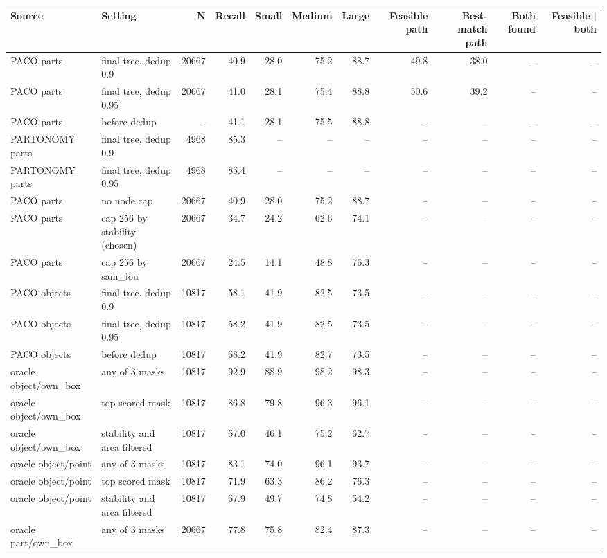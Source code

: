 \begin{tabular}{llrrrrrrrrr}
\toprule
Source & Setting & N & Recall & Small & Medium & Large & Feasible path & Best-match path & Both found & Feasible $\mid$ both \\
\midrule
PACO parts & final tree, dedup 0.9 & 20667 & 40.9 & 28.0 & 75.2 & 88.7 & 49.8 & 38.0 & -- & -- \\
PACO parts & final tree, dedup 0.95 & 20667 & 41.0 & 28.1 & 75.4 & 88.8 & 50.6 & 39.2 & -- & -- \\
PACO parts & before dedup & -- & 41.1 & 28.1 & 75.5 & 88.8 & -- & -- & -- & -- \\
PARTONOMY parts & final tree, dedup 0.9 & 4968 & 85.3 & -- & -- & -- & -- & -- & -- & -- \\
PARTONOMY parts & final tree, dedup 0.95 & 4968 & 85.4 & -- & -- & -- & -- & -- & -- & -- \\
\midrule
PACO parts & no node cap & 20667 & 40.9 & 28.0 & 75.2 & 88.7 & -- & -- & -- & -- \\
PACO parts & cap 256 by stability (chosen) & 20667 & 34.7 & 24.2 & 62.6 & 74.1 & -- & -- & -- & -- \\
PACO parts & cap 256 by sam\_iou & 20667 & 24.5 & 14.1 & 48.8 & 76.3 & -- & -- & -- & -- \\
\midrule
PACO objects & final tree, dedup 0.9 & 10817 & 58.1 & 41.9 & 82.5 & 73.5 & -- & -- & -- & -- \\
PACO objects & final tree, dedup 0.95 & 10817 & 58.2 & 41.9 & 82.5 & 73.5 & -- & -- & -- & -- \\
PACO objects & before dedup & 10817 & 58.2 & 41.9 & 82.7 & 73.5 & -- & -- & -- & -- \\
\midrule
oracle object/own\_box & any of 3 masks & 10817 & 92.9 & 88.9 & 98.2 & 98.3 & -- & -- & -- & -- \\
oracle object/own\_box & top scored mask & 10817 & 86.8 & 79.8 & 96.3 & 96.1 & -- & -- & -- & -- \\
oracle object/own\_box & stability and area filtered & 10817 & 57.0 & 46.1 & 75.2 & 62.7 & -- & -- & -- & -- \\
oracle object/point & any of 3 masks & 10817 & 83.1 & 74.0 & 96.1 & 93.7 & -- & -- & -- & -- \\
oracle object/point & top scored mask & 10817 & 71.9 & 63.3 & 86.2 & 76.3 & -- & -- & -- & -- \\
oracle object/point & stability and area filtered & 10817 & 57.9 & 49.7 & 74.8 & 54.2 & -- & -- & -- & -- \\
oracle part/own\_box & any of 3 masks & 20667 & 77.8 & 75.8 & 82.4 & 87.3 & -- & -- & -- & -- \\

\end{tabular}
